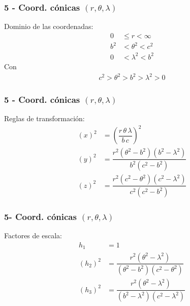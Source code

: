 \documentclass[12pt]{beamer}
\begin{document}
\begin{frame}
\frametitle{5 - Coord. cónicas $(r, \theta, \lambda)$}
\fontsize{12}{12}\selectfont
Dominio de las coordenadas:
\pause
\begin{align*}
0 &\leq r < \infty \\
b^{2} &< \theta^{2} < c^{2} \\
0 &< \lambda^{2} < b^{2}
\end{align*}
Con
\begin{align*}
c^{2} > \theta^{2} > b^{2} > \lambda^{2} > 0
\end{align*}
\end{frame}
\begin{frame}
\frametitle{5 - Coord. cónicas $(r, \theta, \lambda)$}
\fontsize{12}{12}\selectfont
Reglas de transformación:
\pause
\begin{align*}
(x)^{2} &= \left( \dfrac{r \, \theta \, \lambda}{b \, c} \right)^{2} \\[0.5em]
(y)^{2} &= \dfrac{r^{2} (\theta^{2} - b^{2})(b^{2} - \lambda^{2})}{b^{2}(c^{2} - b^{2})} \\[0.5em]
(z)^{2} &= \dfrac{r^{2} (c^{2} - \theta^{2})(c^{2} - \lambda^{2})}{c^{2} (c^{2} - b^{2})}
\end{align*}
\end{frame}
\begin{frame}
\frametitle{5- Coord. cónicas $(r, \theta, \lambda)$}
\fontsize{12}{12}\selectfont
Factores de escala:
\pause
\begin{align*}
h_{1} &= 1\\
(h_{2})^{2} &= \dfrac{r^{2} (\theta^{2} - \lambda^{2})}{(\theta^{2} - b^{2})(c^{2} - \theta^{2})} \\[0.5em]
(h_{3})^{2} &= \dfrac{r^{2} (\theta^{2} - \lambda^{2})}{(b^{2} - \lambda^{2})(c^{2} - \lambda^{2})}
\end{align*}
\end{frame}
\end{document}
